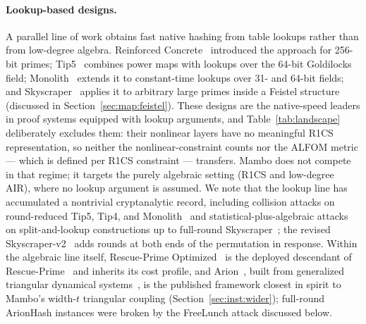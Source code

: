 \documentclass[11pt,a4paper]{article}
\theoremstyle{definition}
\begin{document}
\paragraph{Lookup-based designs.}
A parallel line of work obtains fast native hashing from table
lookups rather than from low-degree algebra. Reinforced
Concrete~\cite{ReinforcedConcrete} introduced the approach for
256-bit primes; Tip5~\cite{Tip5} combines power maps with lookups
over the 64-bit Goldilocks field; Monolith~\cite{Monolith} extends it
to constant-time lookups over 31- and 64-bit fields; and
Skyscraper~\cite{Skyscraper} applies it to arbitrary large primes
inside a Feistel structure (discussed in
Section~\ref{sec:map:feistel}). These designs are the native-speed
leaders in proof systems equipped with lookup arguments, and
Table~\ref{tab:landscape} deliberately excludes them: their nonlinear
layers have no meaningful R1CS representation, so neither the
nonlinear-constraint counts nor the ALFOM metric --- which is defined
per R1CS constraint --- transfers. Mambo does not compete in that
regime; it targets the purely algebraic setting (R1CS and low-degree
AIR), where no lookup argument is assumed. We note that the lookup
line has accumulated a nontrivial cryptanalytic record, including
collision attacks on round-reduced Tip5, Tip4, and
Monolith~\cite{Tip5_Monolith_collisions} and statistical-plus-algebraic
attacks on split-and-lookup constructions up to full-round
Skyscraper~\cite{Skyscraper_dist,Skyscraper_break}; the revised
Skyscraper-v2~\cite{Skyscraper} adds rounds at both ends of the
permutation in response. Within the algebraic line itself, Rescue-Prime
Optimized~\cite{RPO} is the deployed descendant of
Rescue-Prime~\cite{Aly_Poseidon,Rescue} and inherits its cost
profile, and
Arion~\cite{Arion}, built from generalized triangular dynamical
systems~\cite{GTDS}, is the published framework closest in spirit to
Mambo's width-$t$ triangular coupling
(Section~\ref{sec:inst:wider}); full-round ArionHash instances were
broken by the FreeLunch attack discussed below.
\end{document}
